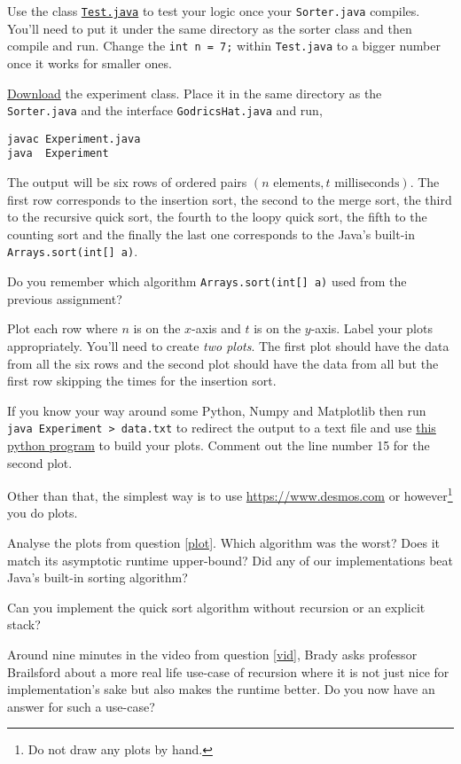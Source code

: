 \documentclass{homework}
\newcommand\download{\href{%
    https://tashfeen.org/s/ds/Experiment.java%
  }{Download}}
\begin{document}
Use the class
\href{https://tashfeen.org/s/ds/Test.java}{\texttt{Test.java}}
to test your logic once your \texttt{Sorter.java} compiles. You'll
need to put it under the same directory as the sorter class and
then compile and run. Change the \texttt{int n = 7;} within
\texttt{Test.java} to a bigger number once it works for smaller
ones.

\question\label{plot} \download{} the experiment class. Place it in
the same directory as the \texttt{Sorter.java} and the interface
\texttt{GodricsHat.java} and run,
\begin{verbatim}
javac Experiment.java
java  Experiment
\end{verbatim}

The output will be six rows of ordered pairs $(n \text{ elements},
  t \text{ milliseconds})$. The first row corresponds to the
insertion sort, the second to the merge sort, the third to the
recursive quick sort, the fourth to the loopy quick sort, the
fifth to the counting sort and the finally the last one
corresponds to the Java's built-in \texttt{Arrays.sort(int[] a)}.

Do you remember which algorithm \texttt{Arrays.sort(int[] a)} used
from the previous assignment?

Plot each row where $n$ is on the $x$-axis and $t$ is on the
$y$-axis. Label your plots appropriately. You'll need to create
\textit{two plots}. The first plot should have the data from all
the six rows and the second plot should have the data from all but
the first row \ie skipping the times for the insertion sort.

If you know your way around some Python, Numpy and Matplotlib then
run \texttt{java Experiment > data.txt} to redirect the output to
a text file and use
\href{https://tashfeen.org/s/ds/plot.py}{this python
  program} to build your plots. Comment out the line number 15 for
the second plot.

Other than that, the simplest way is to use
\url{https://www.desmos.com} or however\footnote{Do not draw any
  plots by hand.} you do plots.

\question Analyse the plots from question \ref{plot}. Which algorithm was the worst? Does it match its asymptotic runtime upper-bound? Did any of our implementations beat Java's built-in sorting algorithm?

\question Can you implement the quick sort algorithm without recursion or an
explicit stack?

\question Around nine minutes in the video from question \ref{vid}, Brady asks professor Brailsford about a more real life use-case of recursion where it is not just nice for implementation's sake but also makes the runtime better. Do you now have an answer for such a use-case?
\end{document}

